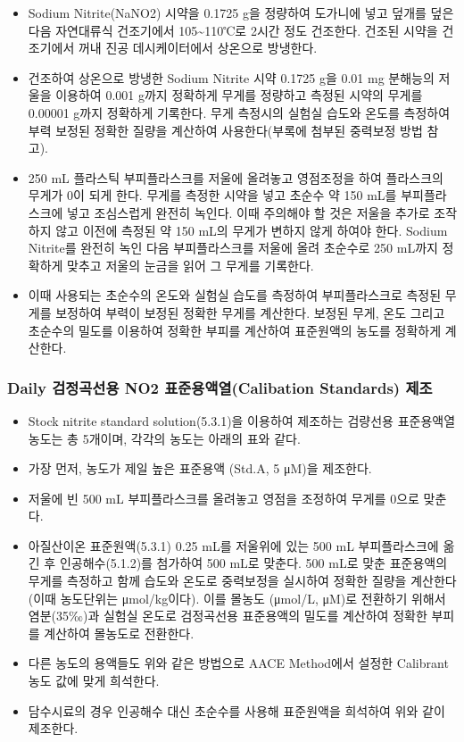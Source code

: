 \documentclass[
]{book}
\providecommand{\tightlist}{%
  \setlength{\itemsep}{0pt}\setlength{\parskip}{0pt}}
\begin{document}
\begin{itemize}
\tightlist
\item
  Sodium Nitrite(NaNO2) 시약을 0.1725 g을 정량하여 도가니에 넣고 덮개를 덮은 다음 자연대류식 건조기에서 105\textasciitilde110℃로 2시간 정도 건조한다. 건조된 시약을 건조기에서 꺼내 진공 데시케이터에서 상온으로 방냉한다.
\item
  건조하여 상온으로 방냉한 Sodium Nitrite 시약 0.1725 g을 0.01 mg 분해능의 저울을 이용하여 0.001 g까지 정확하게 무게를 정량하고 측정된 시약의 무게를 0.00001 g까지 정확하게 기록한다. 무게 측정시의 실험실 습도와 온도를 측정하여 부력 보정된 정확한 질량을 계산하여 사용한다(부록에 첨부된 중력보정 방법 참고).
\item
  250 mL 플라스틱 부피플라스크를 저울에 올려놓고 영점조정을 하여 플라스크의 무게가 0이 되게 한다. 무게를 측정한 시약을 넣고 초순수 약 150 mL를 부피플라스크에 넣고 조심스럽게 완전히 녹인다. 이때 주의해야 할 것은 저울을 추가로 조작하지 않고 이전에 측정된 약 150 mL의 무게가 변하지 않게 하여야 한다. Sodium Nitrite를 완전히 녹인 다음 부피플라스크를 저울에 올려 초순수로 250 mL까지 정확하게 맞추고 저울의 눈금을 읽어 그 무게를 기록한다.
\item
  이때 사용되는 초순수의 온도와 실험실 습도를 측정하여 부피플라스크로 측정된 무게를 보정하여 부력이 보정된 정확한 무게를 계산한다. 보정된 무게, 온도 그리고 초순수의 밀도를 이용하여 정확한 부피를 계산하여 표준원액의 농도를 정확하게 계산한다.
\end{itemize}

\hypertarget{daily-uxac80uxc815uxace1uxc120uxc6a9-no2-uxd45cuxc900uxc6a9uxc561uxc5f4calibation-standards-uxc81cuxc870}{%
\subsubsection{Daily 검정곡선용 NO2 표준용액열(Calibation Standards) 제조}\label{daily-uxac80uxc815uxace1uxc120uxc6a9-no2-uxd45cuxc900uxc6a9uxc561uxc5f4calibation-standards-uxc81cuxc870}}

\begin{itemize}
\tightlist
\item
  Stock nitrite standard solution(5.3.1)을 이용하여 제조하는 검량선용 표준용액열 농도는 총 5개이며, 각각의 농도는 아래의 표와 같다.
\item
  가장 먼저, 농도가 제일 높은 표준용액 (Std.A, 5 μM)을 제조한다.
\item
  저울에 빈 500 mL 부피플라스크를 올려놓고 영점을 조정하여 무게를 0으로 맞춘다.
\item
  아질산이온 표준원액(5.3.1) 0.25 mL를 저울위에 있는 500 mL 부피플라스크에 옮긴 후 인공해수(5.1.2)를 첨가하여 500 mL로 맞춘다. 500 mL로 맞춘 표준용액의 무게를 측정하고 함께 습도와 온도로 중력보정을 실시하여 정확한 질량을 계산한다 (이때 농도단위는 μmol/kg이다). 이를 몰농도 (μmol/L, μM)로 전환하기 위해서 염분(35‰)과 실험실 온도로 검정곡선용 표준용액의 밀도를 계산하여 정확한 부피를 계산하여 몰농도로 전환한다.
\item
  다른 농도의 용액들도 위와 같은 방법으로 AACE Method에서 설정한 Calibrant 농도 값에 맞게 희석한다.
\item
  담수시료의 경우 인공해수 대신 초순수를 사용해 표준원액을 희석하여 위와 같이 제조한다.
\end{itemize}
\end{document}
